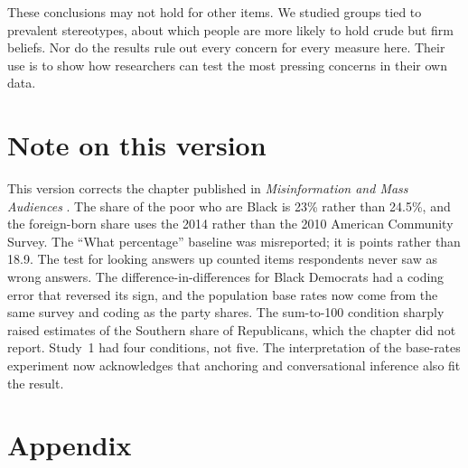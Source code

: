\documentclass[11pt]{article}
\newcommand{\TableStyle}{\small\setlength{\tabcolsep}{5pt}\renewcommand{\arraystretch}{1.05}}
\begin{document}
These conclusions may not hold for other items. We studied groups tied to prevalent stereotypes, about which people are more likely to hold crude but firm beliefs. Nor do the results rule out every concern for every measure here. Their use is to show how researchers can test the most pressing concerns in their own data.

\section*{Note on this version}

This version corrects the chapter published in \emph{Misinformation and Mass Audiences} \citep{ahlersood2018chapter}. The share of the poor who are Black is 23\% rather than 24.5\%, and the foreign-born share uses the 2014 rather than the 2010 American Community Survey. The ``What percentage'' baseline was misreported; it is \percentBias{} points rather than 18.9. The test for looking answers up counted items respondents never saw as wrong answers. The difference-in-differences for Black Democrats had a coding error that reversed its sign, and the population base rates now come from the same survey and coding as the party shares. The sum-to-100 condition sharply raised estimates of the Southern share of Republicans, which the chapter did not report. Study~1 had four conditions, not five. The interpretation of the base-rates experiment now acknowledges that anchoring and conversational inference also fit the result.




\clearpage
\appendix
\renewcommand{\thetable}{A\arabic{table}}
\renewcommand{\thefigure}{A\arabic{figure}}
\setcounter{table}{0}
\setcounter{figure}{0}

\section{Appendix}

\begin{table}[htbp]
\centering
\caption{Sample composition (\%). Study~1 race is check-all-that-apply; Study~2 offered one choice. Study~2 did not ask about education.}
\label{tab:samples}
{\TableStyle}
\end{table}

\begin{table}[htbp]
\centering
\caption{Benchmarks. True shares for the party items are among identifiers and leaners. Population base rates are the groups' shares among all adults, from the same source.}
\label{tab:benchmarks}
{\TableStyle}
\end{table}
\end{document}
